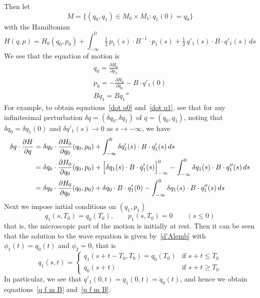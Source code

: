 \documentclass{amsart}
\begin{document}
Then let
\begin{equation}
M = \{ (q_0, q_1) \in M_0 \times M_1 : q_1(0) = q_0 \}
\end{equation}
with the Hamiltonian
\begin{equation}
H(q,p) = H_0(q_0,p_0) + \int_{-\infty}^0 \tfrac12\,p_1(s)\cdot B^{-1}\cdot p_1(s) + \tfrac12 \, q'_1(s)\cdot B \cdot q'_1(s) \, ds
\end{equation}
We see that the equation of motion is
\begin{gather}
\label{dot q0}
\dot q_0 = \frac{\partial H_0}{\partial p_0} \\
\dot p_0 = - \frac{\partial H_0}{\partial q_0} - B \cdot q'_1(0) \\
\label{dot q1}
B \ddot q_1 = B q_1''
\end{gather}
For example, to obtain equations~\eqref{dot q0} and~\eqref{dot q1}, see that for any infinitesimal perturbation $\delta q = (\delta q_0, \delta q_1)$ of $q = (q_0,q_1)$, noting that $\delta q_0 = \delta q_1(0)$ and $\delta q'_1(s) \to 0$ as $s \to -\infty$, we have
\begin{align*}
\delta q \cdot \frac{\partial H}{\partial q}
&=
\delta q_0 \cdot \frac{\partial H_0}{\partial q_0}(q_0,p_0) + \int_{-\infty}^0 \delta q'_1(s)\cdot B \cdot q'_1(s) \, ds \\
&=
\delta q_0 \cdot \frac{\partial H_0}{\partial q_0}(q_0,p_0) + \Bigl[ \delta q_1(s)\cdot B \cdot q'_1(s) \Bigr]_{-\infty}^0 - \int_{-\infty}^0 \delta q_1(s)\cdot B \cdot q''_1(s) \, ds \\
&=
\delta q_0 \cdot \frac{\partial H_0}{\partial q_0}(q_0,p_0) + \delta q_0\cdot B \cdot q'_1(0) - \int_{-\infty}^0 \delta q_1(s)\cdot B \cdot q''_1(s) \, ds
\end{align*}
Next we impose initial conditions on $(q_1,p_1)$
\begin{equation}
\label{wave init}
q_1(s,T_0) = q_0(T_0), \qquad
p_1(s,T_0) = 0 \qquad (s \le 0)
\end{equation}
that is, the microscopic part of the motion is initially at rest.  Then it can be seen that the solution to the wave equation is given by~\eqref{d'Alemb} with $\phi_1(t) = q_0(t)$ and $\phi_2 = 0$, that is
\begin{equation}
\label{wave sol}
q_1(s,t) = \begin{cases}q_1(s+t-T_0,T_0) = q_0(T_0) & \text{if $s+t \le T_0$} \\ q_0(s+t) & \text{if $s+t \ge T_0$} \end{cases}
\end{equation}
In particular, we see that $q'_1(0,t) = \dot q_1(0,t) = \dot q_0(t)$, and hence we obtain equations~\eqref{q f m B} and~\eqref{p f m B}.
\end{document}
